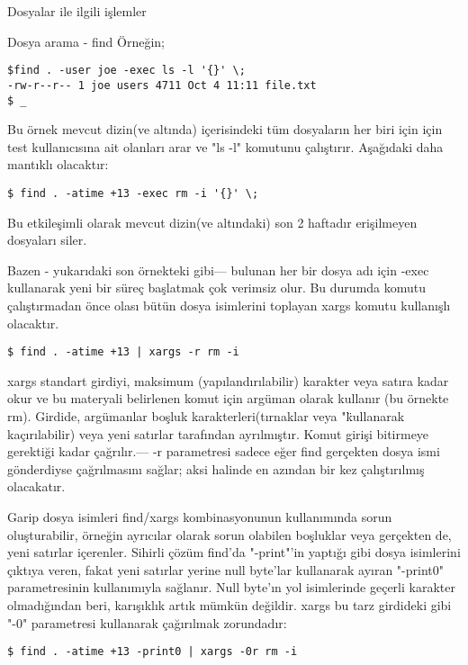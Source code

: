 \begin{section}{Dosyalar ile ilgili işlemler}
\begin{subsection}{Dosya arama - find}
Örneğin;
\begin{verbatim}
$find . -user joe -exec ls -l '{}' \;
-rw-r--r-- 1 joe users 4711 Oct 4 11:11 file.txt
$ _
\end{verbatim}

Bu örnek mevcut dizin(ve altında) içerisindeki tüm dosyaların her biri için için test kullanıcısına ait olanları arar ve "ls -l" komutunu çalıştırır. Aşağıdaki daha mantıklı olacaktır:

\begin{verbatim}
$ find . -atime +13 -exec rm -i '{}' \; 
\end{verbatim}

Bu etkileşimli olarak mevcut dizin(ve altındaki) son 2 haftadır erişilmeyen dosyaları siler.

Bazen - yukarıdaki son örnekteki gibi— bulunan her bir dosya adı için -exec kullanarak yeni bir süreç başlatmak çok verimsiz olur. Bu durumda komutu çalıştırmadan önce olası bütün dosya isimlerini toplayan xargs komutu kullanışlı olacaktır.
\begin{verbatim}
$ find . -atime +13 | xargs -r rm -i
\end{verbatim}
xargs standart girdiyi,  maksimum (yapılandırılabilir) karakter veya satıra kadar okur ve bu materyali belirlenen komut için argüman olarak kullanır (bu örnekte rm). Girdide, argümanlar boşluk karakterleri(tırnaklar veya "\" kullanarak kaçırılabilir) veya yeni satırlar tarafından ayrılmıştır. Komut girişi bitirmeye gerektiği kadar çağrılır.— -r parametresi sadece eğer find gerçekten dosya ismi gönderdiyse çağrılmasını sağlar; aksi halinde en azından bir kez çalıştırılmış olacakatır.

Garip dosya isimleri find/xargs kombinasyonunun kullanımında sorun oluşturabilir, örneğin ayrıcılar olarak sorun olabilen boşluklar veya gerçekten de, yeni satırlar içerenler. Sihirli çözüm find'da "-print"'in yaptığı gibi dosya isimlerini çıktıya veren, fakat yeni satırlar yerine null byte'lar kullanarak ayıran "-print0" parametresinin kullanımıyla sağlanır. Null byte'ın yol isimlerinde geçerli karakter olmadığından beri, karışıklık artık mümkün değildir. xargs bu tarz girdideki gibi "-0" parametresi kullanarak çağırılmak zorundadır:
\begin{verbatim}
$ find . -atime +13 -print0 | xargs -0r rm -i
\end{verbatim}


\end{subsection}
\end{section}
